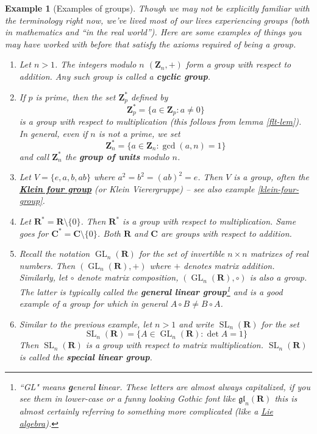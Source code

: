\documentclass[12pt]{article}
\numberwithin{equation}{subsection}
\theoremstyle{note}
\newtheorem{example}[subsection]{Example}
\newcommand{\GL}{\operatorname{GL}}
\newcommand{\SL}{\operatorname{SL}}
\begin{document}
\begin{example}[Examples of groups] \label{groups-example} Though we may not be explicitly familiar with the terminology right now, we've lived most of our lives experiencing groups (both in mathematics and ``in the real world''). Here are some examples of things you may have worked with before that satisfy the axioms required of being a group.

\begin{enumerate}
\item Let $n>1$. The integers modulo $n$ $(\mathbf{Z}_n,+)$ form a group with respect to addition. Any such group is called a \textbf{cyclic group}.
\item \label{star-Zn} If $p$ is prime, then the set $\mathbf{Z}_p^*$ defined by \[ \mathbf{Z}_p^*=\{ a\in\mathbf{Z}_p : a\neq 0\}\] is a group with respect to multiplication (this follows from lemma \ref{flt-lem}). In general, even if $n$ is not a prime, we set \begin{equation} \mathbf{Z}_n^*=\{ a\in\mathbf{Z}_n : \gcd(a,n)=1\}\end{equation} and call $\mathbf{Z}_n^*$ the \textbf{group of units} modulo $n$. 
\item Let $V=\{e,a,b,ab\}$ where $a^2=b^2=(ab)^2=e$. Then $V$ is a group, often the \href{https://en.wikipedia.org/wiki/Klein_four-group}{\textbf{Klein four group}} (or \textit{Klein Vierergruppe}) -- see also example \ref{klein-four-group}.
\item Let $\mathbf{R}^*=\mathbf{R}\setminus \{0\}$. Then $\mathbf{R}^*$ is a group with respect to multiplication. Same goes for $\mathbf{C}^*=\mathbf{C}\setminus \{0\}$. Both $\mathbf{R}$ and $\mathbf{C}$ are groups with respect to addition.
\item Recall the notation $\GL_n(\mathbf{R})$ for the set of invertible $n\times n$ matrixes of real numbers. Then $(\GL_n(\mathbf{R}),+)$ where $+$ denotes matrix addition. Similarly, let $\circ$ denote matrix composition, $(\GL_n(\mathbf{R}),\circ)$ is also a group. The latter is typically called the \textbf{general linear group}\footnote{``GL" means \textbf{g}eneral \textbf{l}inear. These letters are almost always capitalized, if you see them in lower-case or a funny looking Gothic font like $\mathfrak{gl}_n(\mathbf{R})$ this is almost certainly referring to something more complicated (like a \href{https://en.wikipedia.org/wiki/Lie_algebra}{Lie algebra}).} and is a good example of a group for which in general $A\circ B\neq B\circ A$.
\item Similar to the previous example, let $n>1$ and write $\SL_n (\mathbf{R})$ for the set \begin{equation} \SL_n(\mathbf{R})=\{ A\in\GL_n(\mathbf{R}) : \det A=1\}\end{equation} Then $\SL_n(\mathbf{R})$ is a group with respect to matrix multiplication. $\SL_n(\mathbf{R})$ is called the \textbf{special linear group}.


\end{enumerate}
\end{example}
\end{document}
